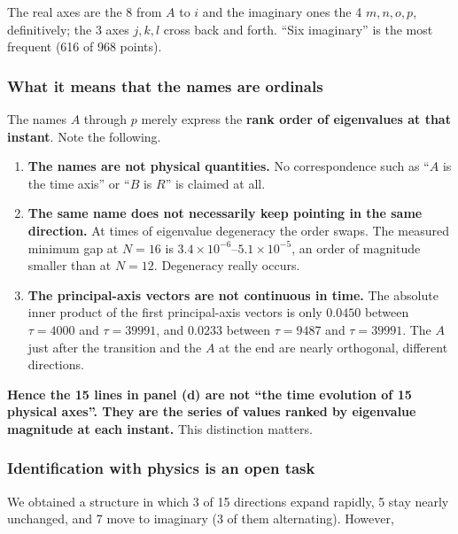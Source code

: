 \documentclass[
  10pt,
]{article}
\providecommand{\tightlist}{%
  \setlength{\itemsep}{0pt}\setlength{\parskip}{0pt}}
\begin{document}
The real axes are the 8 from \(A\) to \(i\) and the imaginary ones the 4
\(m,n,o,p\), definitively; the 3 axes \(j,k,l\) cross back and forth.
``Six imaginary'' is the most frequent (616 of 968 points).

\subsubsection{What it means that the names are
ordinals}\label{what-it-means-that-the-names-are-ordinals}

The names \(A\) through \(p\) merely express the \textbf{rank order of
eigenvalues at that instant}. Note the following.

\begin{enumerate}
\def\labelenumi{\arabic{enumi}.}
\tightlist
\item
  \textbf{The names are not physical quantities.} No correspondence such
  as ``\(A\) is the time axis'' or ``\(B\) is \(R\)'' is claimed at all.
\item
  \textbf{The same name does not necessarily keep pointing in the same
  direction.} At times of eigenvalue degeneracy the order swaps. The
  measured minimum gap at \(N=16\) is
  \(3.4\times10^{-6}\)--\(5.1\times10^{-5}\), an order of magnitude
  smaller than at \(N=12\). Degeneracy really occurs.
\item
  \textbf{The principal-axis vectors are not continuous in time.} The
  absolute inner product of the first principal-axis vectors is only
  \(0.0450\) between \(\tau=4000\) and \(\tau=39991\), and \(0.0233\)
  between \(\tau=9487\) and \(\tau=39991\). The \(A\) just after the
  transition and the \(A\) at the end are nearly orthogonal, different
  directions.
\end{enumerate}

\textbf{Hence the 15 lines in panel (d) are not ``the time evolution of
15 physical axes''. They are the series of values ranked by eigenvalue
magnitude at each instant.} This distinction matters.

\subsubsection{Identification with physics is an open
task}\label{identification-with-physics-is-an-open-task}

We obtained a structure in which 3 of 15 directions expand rapidly, 5
stay nearly unchanged, and 7 move to imaginary (3 of them alternating).
However,
\end{document}
